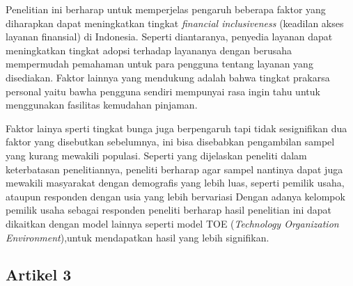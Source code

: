 \documentclass{article}
\begin{document}
Penelitian ini berharap untuk memperjelas pengaruh beberapa faktor 
yang diharapkan dapat meningkatkan tingkat 
\emph{financial inclusiveness} (keadilan akses layanan finansial) di Indonesia. 
Seperti diantaranya, penyedia layanan dapat meningkatkan 
tingkat adopsi terhadap layananya dengan 
berusaha mempermudah pemahaman 
untuk para pengguna tentang layanan yang disediakan. 
Faktor lainnya yang mendukung adalah bahwa tingkat prakarsa personal 
yaitu bawha pengguna sendiri mempunyai rasa ingin tahu 
untuk menggunakan fasilitas kemudahan pinjaman.

Faktor lainya sperti tingkat bunga juga berpengaruh tapi tidak sesignifikan dua faktor yang disebutkan sebelumnya,
ini bisa disebabkan pengambilan sampel yang kurang mewakili populasi. 
Seperti yang dijelaskan peneliti dalam keterbatasan penelitiannya, peneliti berharap agar
sampel nantinya dapat juga mewakili masyarakat dengan demografis yang lebih luas, 
seperti pemilik usaha, ataupun responden dengan usia yang lebih bervariasi
Dengan adanya kelompok pemilik usaha sebagai responden peneliti 
berharap hasil penelitian ini dapat dikaitkan dengan model lainnya
 seperti model TOE (\emph{Technology Organization Environment}),untuk mendapatkan hasil yang lebih signifikan.



\subsection{Artikel 3}
\end{document}
